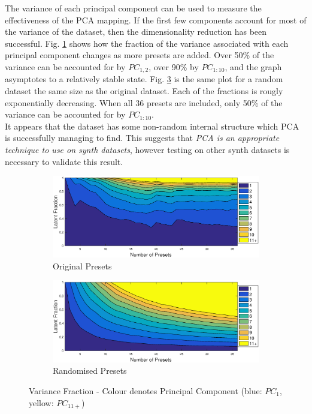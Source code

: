 \documentclass[11pt, oneside]{report}   	%
\begin{document}
The variance of each principal component can be used to measure the effectiveness of the PCA mapping. If the first few components account for most of the variance of the dataset, then the dimensionality reduction has been successful.
Fig. \ref{fig:LatentOriginal} shows how the fraction of the variance associated with each principal component changes as more presets are added. Over 50\% of the variance can be accounted for by $PC_{1,2}$,  over 90\% by $PC_{1 : 10}$, and the graph asymptotes to a relatively stable state. Fig. \ref{fig:LatentRandom} is the same plot for a random dataset the same size as the original dataset. Each of the fractions is rougly exponentially decreasing. When all 36 presets are included, only 50\% of the variance can be accounted for by $PC_{1 : 10}$. \\
It appears that the dataset has some non-random internal structure which PCA is successfully managing to find. This suggests that \emph{PCA is an appropriate technique to use on synth datasets}, however testing on other synth datasets is necessary to validate this result.
\begin{figure}[h]
	\vspace{-5pt}
	\hspace{-40pt}
	\begin{subfigure}{3.5in}
		\includegraphics[trim = {0, 0.1cm, 0, 0.5cm}, clip, width = \textwidth]{LatentFraction.eps}
		\caption{Original Presets}
		\label{fig:LatentOriginal}
	\end{subfigure} 
%
	\begin{subfigure}{3.5in}
		\includegraphics[trim = {0, 0.1cm, 0, 0.5cm}, clip, width = \textwidth]{LatentFractionRandom.eps}
		\caption{Randomised Presets}
		\label{fig:LatentRandom}
	\end{subfigure}
	\caption{Variance Fraction - Colour denotes Principal Component (blue: $PC_1$, yellow: $PC_{11+}$)}
\end{figure}
\end{document}
